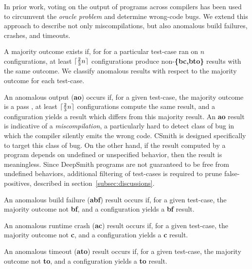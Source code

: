 In prior work, voting on the output of programs across compilers has been used to circumvent the \emph{oracle problem} and determine wrong-code bugs.
We extend this approach to describe not only miscompilations, but also anomalous build failures, crashes, and timeouts.

A majority outcome exists if, for for a particular test-case ran on $n$ configurations, at least $\lceil\frac{2}{3}n\rceil$ configurations produce non-\textbf{\{bc,bto\}} results with the same outcome. We classify anomalous results with respect to the majority outcome for each test-case.

An anomalous output (\textbf{ao}) occurs if, for a given test-case, the majority outcome is a pass \textbf{\cmark}, at least $\lceil\frac{2}{3}n\rceil$ configurations compute the same result, and a configuration yields a result which differs from this majority result. An \textbf{ao} result is indicative of a \emph{miscompilation}, a particularly hard to detect class of bug in which the compiler silently emits the wrong code. CSmith is designed specifically to target this class of bug. On the other hand, if the result computed by a program depends on undefined or unspecified behavior, then the result is meaningless. Since DeepSmith programs are not guaranteed to be free from undefined behaviors, additional filtering of test-cases is required to prune false-positives, described in section~\ref{subsec:discussions}.

An anomalous build failure (\textbf{abf}) result occurs if, for a given test-case, the majority outcome not \textbf{bf}, and a configuration yields a \textbf{bf} result.

An anomalous runtime crash (\textbf{ac}) result occurs if, for a given test-case, the majority outcome not \textbf{c}, and a configuration yields a \textbf{c} result.

An anomalous timeout (\textbf{ato}) result occurs if, for a given test-case, the majority outcome not \textbf{to}, and a configuration yields a \textbf{to} result.


